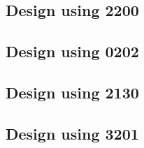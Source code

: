 \subsection{Design using 2200}


 \begin{center}




 \end{center}



\subsection{Design using 0202}


 \begin{center}




 \end{center}



\subsection{Design using 2130}


 \begin{center}




 \end{center}



\subsection{Design using 3201}



